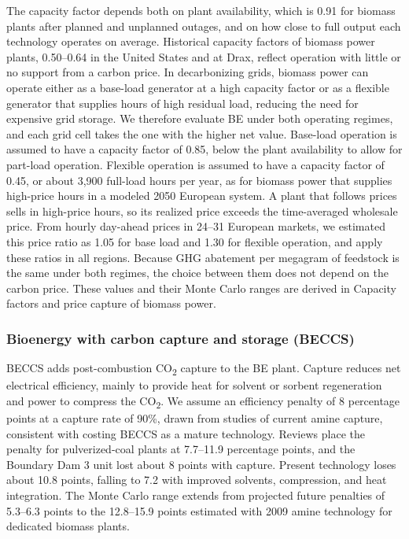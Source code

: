 \documentclass[
  letterpaper,
  twoside,
  twocolumn,
  9pt]{article}
\begin{document}
The capacity factor depends both on plant availability, which is 0.91
for biomass plants after planned and unplanned outages,\citep{dea2026}
and on how close to full output each technology operates on average.
Historical capacity factors of biomass power plants, 0.50--0.64 in the
United States and at Drax,\citep{eia2026epm, drax2025} reflect operation
with little or no support from a carbon price. In decarbonizing grids,
biomass power can operate either as a base-load generator at a high
capacity factor \citep{daggash2019, prado2023} or as a flexible
generator that supplies hours of high residual load, reducing the need
for expensive grid storage.\citep{johansson2019, lehtveer2021} We
therefore evaluate BE under both operating regimes, and each grid cell
takes the one with the higher net value. Base-load operation is assumed
to have a capacity factor of 0.85, below the plant availability to allow
for part-load operation. Flexible operation is assumed to have a
capacity factor of 0.45, or about 3,900 full-load hours per year, as for
biomass power that supplies high-price hours in a modeled 2050 European
system.\citep{lehtveer2021} A plant that follows prices sells in
high-price hours, so its realized price exceeds the time-averaged
wholesale price. From hourly day-ahead prices in 24--31 European
markets,\citep{ember2026hourly} we estimated this price ratio as 1.05
for base load and 1.30 for flexible operation, and apply these ratios in
all regions. Because GHG abatement per megagram of feedstock is the same
under both regimes, the choice between them does not depend on the
carbon price. These values and their Monte Carlo ranges are derived in
Capacity factors and price capture of biomass power.

\subsubsection{Bioenergy with carbon capture and storage
(BECCS)}\label{bioenergy-with-carbon-capture-and-storage-beccs}

BECCS adds post-combustion CO\textsubscript{2} capture to the BE plant.
Capture reduces net electrical efficiency, mainly to provide heat for
solvent or sorbent regeneration and power to compress the
CO\textsubscript{2}. We assume an efficiency penalty of 8 percentage
points at a capture rate of 90\%,\citep{ieaghg2009} drawn from studies
of current amine capture, consistent with costing BECCS as a mature
technology. Reviews place the penalty for pulverized-coal plants at
7.7--11.9 percentage points, and the Boundary Dam 3 unit lost about 8
points with capture.\citep{herzog2016} Present technology loses about
10.8 points, falling to 7.2 with improved solvents, compression, and
heat integration.\citep{tramosljika2021} The Monte Carlo range extends
from projected future penalties of 5.3--6.3 points \citep{li2024ccs} to
the 12.8--15.9 points estimated with 2009 amine technology for dedicated
biomass plants.\citep{ieaghg2009}
\end{document}
